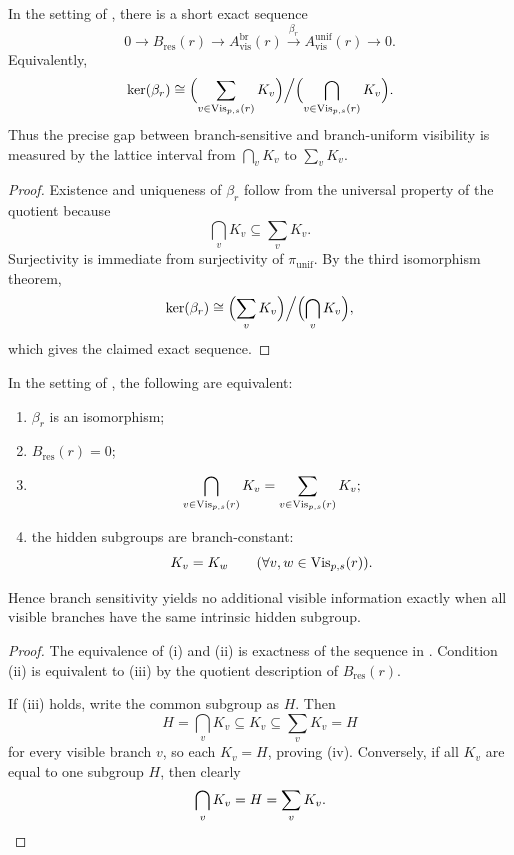 \begin{proposition}\label{thm:branch-comparison-exact-sequence}
In the setting of , there is a short exact sequence
\[
0\longrightarrow B_{\mathrm{res}}(r)\longrightarrow A_{\mathrm{vis}}^{\mathrm{br}}(r)\xrightarrow{\ \beta_r\ } A_{\mathrm{vis}}^{\mathrm{unif}}(r)\longrightarrow 0.
\]
Equivalently,
\[
\ker(\beta_r)
\cong
\Bigl(\sum_{v\in \mathrm{Vis}_{p,s}(r)} K_v\Bigr)\Big/\Bigl(\bigcap_{v\in \mathrm{Vis}_{p,s}(r)} K_v\Bigr).
\]
Thus the precise gap between branch-sensitive and branch-uniform visibility is measured by the lattice interval from $\bigcap_v K_v$ to $\sum_v K_v$.
\end{proposition}

\begin{proof}
Existence and uniqueness of $\beta_r$ follow from the universal property of the quotient because
\[
\bigcap_v K_v\subseteq \sum_v K_v.
\]
Surjectivity is immediate from surjectivity of $\pi_{\mathrm{unif}}$. By the third isomorphism theorem,
\[
\ker(\beta_r)
\cong
\Bigl(\sum_v K_v\Bigr)\Big/\Bigl(\bigcap_v K_v\Bigr),
\]
which gives the claimed exact sequence.
\end{proof}

\begin{corollary}\label{cor:no-branch-gain-criterion}
In the setting of , the following are equivalent:
\begin{enumerate}[label=(\roman*),nosep]
\item $\beta_r$ is an isomorphism;
\item $B_{\mathrm{res}}(r)=0$;
\item
\[
\bigcap_{v\in \mathrm{Vis}_{p,s}(r)} K_v
=
\sum_{v\in \mathrm{Vis}_{p,s}(r)} K_v;
\]
\item the hidden subgroups are branch-constant:
\[
K_v=K_w
\qquad
(\forall v,w\in \mathrm{Vis}_{p,s}(r)).
\]
\end{enumerate}
Hence branch sensitivity yields no additional visible information exactly when all visible branches have the same intrinsic hidden subgroup.
\end{corollary}

\begin{proof}
The equivalence of \textup{(i)} and \textup{(ii)} is exactness of the sequence in . Condition \textup{(ii)} is equivalent to \textup{(iii)} by the quotient description of $B_{\mathrm{res}}(r)$.

If \textup{(iii)} holds, write the common subgroup as $H$. Then
\[
H=\bigcap_v K_v\subseteq K_v\subseteq \sum_v K_v=H
\]
for every visible branch $v$, so each $K_v=H$, proving \textup{(iv)}. Conversely, if all $K_v$ are equal to one subgroup $H$, then clearly
\[
\bigcap_v K_v=H=\sum_v K_v.
\qedhere
\]
\end{proof}

